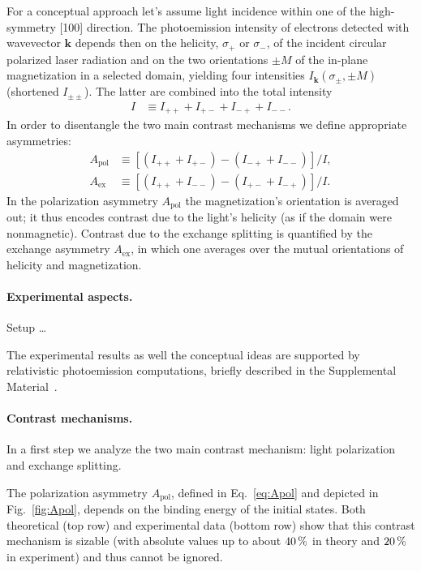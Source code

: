 \documentclass[prl,twocolumn,floatfix]{revtex4-2}
\renewcommand{\vec}[1]{\boldsymbol{#1}}
\begin{document}
For a conceptual approach let's assume light incidence within one of the high-symmetry [100] direction. The photoemission intensity of electrons detected with wavevector $\vec{k}$ depends then on the helicity, $\sigma_{+}$ or $\sigma_{-}$, of the incident circular polarized laser radiation and on the two orientations $\pm M$ of the in-plane magnetization in a selected domain, yielding four intensities $I_{\vec{k}}(\sigma_{\pm}, \pm M)$ (shortened $I_{\pm \pm}$). The latter are combined into the total intensity
\begin{align}
    I & \equiv I_{+ +} + I_{+ -} + I_{- +} + I_{- -}. 
\end{align}
In order to disentangle the two main contrast mechanisms we define appropriate asymmetries:
\begin{subequations}
\begin{align}
    A_{\mathrm{pol}} & \equiv \left[ \left( I_{+ +} + I_{+ -} \right) - \left( I_{- +} + I_{- -} \right) \right] / I,
    \label{eq:Apol}
    \\
    A_{\mathrm{ex}} & \equiv \left[ \left( I_{+ +} + I_{- -} \right) - \left( I_{+ -} + I_{- +} \right) \right] / I.
    \label{eq:Aex}
\end{align}    
\end{subequations}
In the polarization asymmetry $A_{\mathrm{pol}}$ the magnetization's orientation is averaged out; it thus encodes contrast due to the light's helicity (as if the domain were nonmagnetic). Contrast due to the exchange splitting is quantified by the exchange asymmetry $A_{\mathrm{ex}}$, in which one averages over the mutual orientations of helicity and magnetization.

\paragraph{Experimental aspects.} Setup \ldots

The experimental results as well the conceptual ideas are supported by relativistic photoemission computations, briefly described in the Supplemental Material~\cite{Supplement}.

\paragraph{Contrast mechanisms.} In a first step we analyze the two main contrast mechanism: light polarization and exchange splitting.

The polarization asymmetry $A_{\mathrm{pol}}$, defined in Eq.~\eqref{eq:Apol} and depicted in Fig.~\ref{fig:Apol}, depends on the binding energy of the initial states. Both theoretical (top row) and experimental data (bottom row) show
that this contrast mechanism is sizable (with absolute values up to about $\unit[40]{\%}$ in theory and $\unit[20]{\%}$ in experiment) and thus cannot be ignored. 
\end{document}
